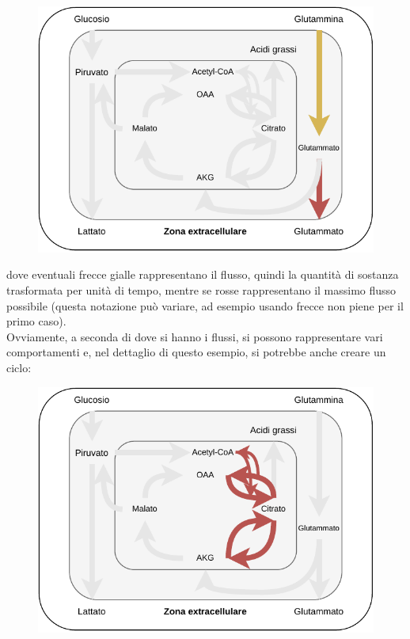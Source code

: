 \documentclass[a4paper,12pt, oneside]{book}
\begin{document}
\begin{figure}[H]
  \centering
  \includegraphics[scale = 0.8]{img/toy.pdf}
\end{figure}
dove eventuali frecce gialle rappresentano il flusso, quindi la
quantità di sostanza trasformata per unità di tempo, mentre se rosse
rappresentano il massimo flusso possibile (questa notazione può variare, ad
esempio usando frecce non piene per il primo caso).\\
Ovviamente, a seconda di dove si hanno i flussi, si possono rappresentare vari
comportamenti e, nel dettaglio di questo esempio, si potrebbe anche creare un
ciclo:
\begin{figure}[H]
  \centering
  \includegraphics[scale = 0.7]{img/toy2.pdf}
\end{figure}
\end{document}
